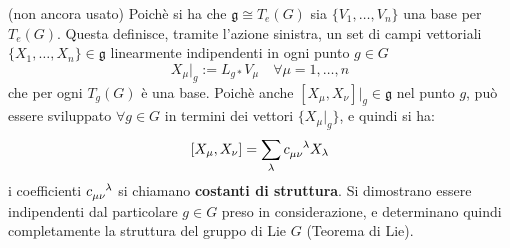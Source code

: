 (non ancora usato)
Poichè si ha che $\mathfrak{g} \cong T_e(G)$ sia $\{ V_1,\dots,V_n \}$ una base
per $T_e(G)$. Questa definisce, tramite l'azione sinistra, un set di campi vettoriali
$\{ X_1, \dots, X_n \} \in \mathfrak{g}$ linearmente indipendenti in ogni punto $g \in G$
$$
   X_\mu |_g := L_{g*}V_\mu \quad \forall \mu = 1,\dots,n
$$
che per ogni $T_g(G)$ è una base. Poichè anche $[X_\mu,X_\nu]|_g \in \mathfrak{g}$
nel punto $g$, può essere sviluppato $ \forall g \in G$ in termini dei vettori
$\{X_\mu|_g\}$, e quindi si ha:
$$
   [X_\mu,X_\nu] = \sum_\lambda c_{\mu\nu}^{\hphantom{\mu\nu}\lambda} X_\lambda
$$
i coefficienti $c_{\mu\nu}^{\hphantom{\mu\nu}\lambda}$ si chiamano
\textbf{costanti di struttura}.
Si dimostrano essere indipendenti dal particolare $g \in G$ preso in considerazione,
e determinano quindi completamente la struttura del gruppo di Lie $G$ (Teorema di Lie).\\


